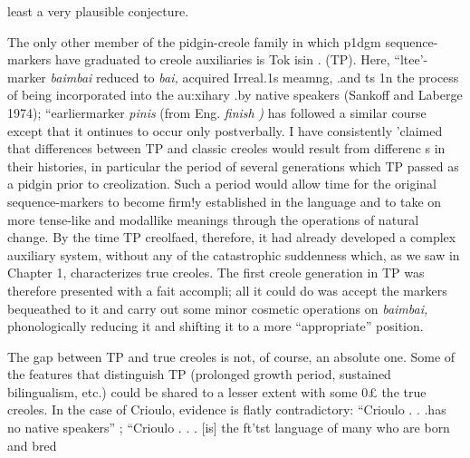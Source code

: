 least a very plausible conjecture.

The only other member of the pidgin-creole family in which p1dgm sequence-markers have graduated to creole auxiliaries is Tok isin . (TP). Here, ``ltee'-marker \textit{baimbai }reduced to \textit{bai, }acquired Irreal.1s meamng, .and ts 1n the process of being incorporated into the au:xihary .by native speakers (Sankoff and Laberge 1974); ``earlier{\textquotedbl}\-marker \textit{pinis} (from Eng. \textit{finish} \textit{)} has followed a similar course except that it ontinues to occur only postverbally. I have consistently 'claimed that differences between TP and classic creoles would result from differenc s in their histories, in particular the period of several genera\-tions which TP passed as a pidgin prior to creolization. Such a period would allow time for the original sequence-markers to become firm!y established in the language and to take on more tense-like and modal\-like meanings through the operations of natural change. By the time TP creolfaed, therefore, it had already developed a complex auxiliary system, without any of the catastrophic suddenness which, as we saw
in Chapter 1, characterizes true creoles. The first creole generation in TP was therefore presented with a fait accompli; all it could do was accept the markers bequeathed to it and carry out some minor cosmetic operations on \textit{baimbai,} phonologically reducing it and shifting it to a more ``appropriate'' position.

The gap between TP and true creoles is not, of course, an abso\-lute one. Some of the features that distinguish TP (prolonged growth period, sustained bilingualism, etc.) could be shared to a lesser extent with some 0£ the true creoles. In the case of Crioulo, evidence is flatly contradictory: ``Crioulo . . .has no native speakers'' \citep{Alleyne1979}; ``Crioulo . . . [is] the ft'tst language of many who are born and bred

